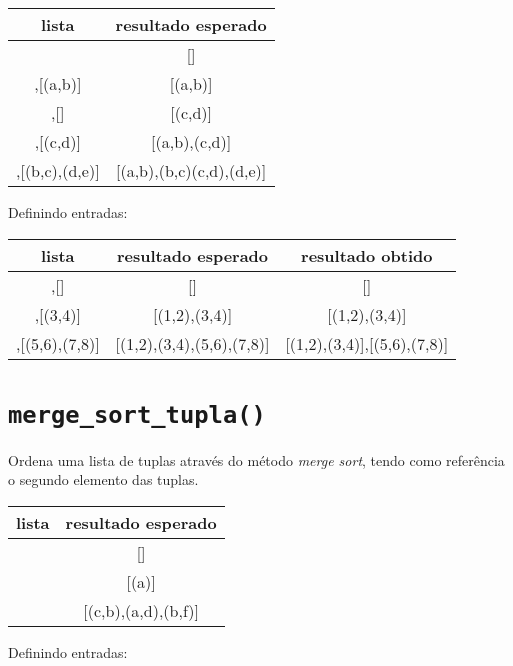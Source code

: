 \begin{apendicesenv}
\begin{center}
    \begin{tabular}{|c|c|}
        \cline{1-2}
        lista & resultado esperado \\ \hline
        [] & [] \\ \hline
        [],[(a,b)] & [(a,b)] \\ \hline
        [(c,d)],[] & [(c,d)] \\ \hline
        [(a,b)],[(c,d)]  & [(a,b),(c,d)] \\ \hline
        [(a,b),(c,d)],[(b,c),(d,e)] & [(a,b),(b,c)(c,d),(d,e)] \\ \hline
    \end{tabular}
\end{center}

Definindo entradas:

\begin{center}
    \begin{tabular}{|c|c|c|}
        \cline{1-3}
        lista & resultado esperado & resultado obtido  \\ \hline
        [],[] & [] & []\\ \hline
        [(1,2)],[(3,4)] & [(1,2),(3,4)] & [(1,2),(3,4)] \\ \hline
        [(1,2),(3,4)],[(5,6),(7,8)] & [(1,2),(3,4),(5,6),(7,8)] & [(1,2),(3,4)],[(5,6),(7,8)] \\ \hline
    \end{tabular}
\end{center}


\section{\texttt{merge\_sort\_tupla()}}
Ordena uma lista de tuplas através do método \textit{merge sort}, tendo como referência o segundo elemento das tuplas.

\begin{center}
    \begin{tabular}{|c|c|}
        \cline{1-2}
        lista & resultado esperado \\ \hline
        [] & [] \\ \hline
        [(a)]  & [(a)] \\ \hline
        [(a,d),(c,b),(b,f)] & [(c,b),(a,d),(b,f)]  \\ \hline
    \end{tabular}
\end{center}


Definindo entradas:


\end{apendicesenv}
